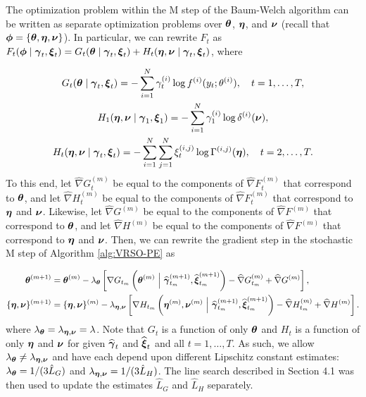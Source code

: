 The optimization problem within the M step of the Baum-Welch algorithm can be written as separate optimization problems over $\boldsymbol{\theta}$, $\boldsymbol{\eta}$, and $\boldsymbol{\nu}$ (recall that $\boldsymbol{\phi} = \{\boldsymbol{\theta},\boldsymbol{\eta},\boldsymbol{\nu}\}$). In particular, we can rewrite $F_t$ as $F_t(\boldsymbol{\phi} \mid \boldsymbol{\gamma}_t,  \boldsymbol{\xi}_t) = G_t(\boldsymbol{\theta} \mid  \boldsymbol{\gamma}_t,  \boldsymbol{\xi}_t) + H_t(\boldsymbol{\eta}, \boldsymbol{\nu} \mid  \boldsymbol{\gamma}_t,  \boldsymbol{\xi}_t)$, where

\begin{gather}
    G_t(\boldsymbol{\theta} \mid  \boldsymbol{\gamma}_t,  \boldsymbol{\xi}_t) = - \sum_{i=1}^N  \gamma^{(i)}_t \log f^{(i)}(y_t;\theta^{(i)}), \quad t = 1,\ldots,T, \\
    H_1(\boldsymbol{\eta}, \boldsymbol{\nu} \mid  \boldsymbol{\gamma}_1,  \boldsymbol{\xi}_1) = - \sum_{i=1}^N  \gamma^{(i)}_1 \log \delta^{(i)}(\boldsymbol{\nu}), \\
    H_t(\boldsymbol{\eta}, \boldsymbol{\nu} \mid \boldsymbol{\gamma}_t,  \boldsymbol{\xi}_t) =  - \sum_{i=1}^N \sum_{j=1}^N  \xi^{(i,j)}_t \log \Gamma^{(i,j)}(\boldsymbol{\eta}), \quad t = 2,\ldots,T.
\end{gather}
%
To this end, let $\widehat \nabla G^{(m)}_{t}$ be equal to the components of $\widehat \nabla F^{(m)}_{t}$ that correspond to $\boldsymbol{\theta}$, and let $\widehat \nabla H^{(m)}_{t}$ be equal to the components of $\widehat \nabla F^{(m)}_{t}$ that correspond to $\boldsymbol{\eta}$ and $\boldsymbol{\nu}$. Likewise, let $\widehat \nabla G^{(m)}$ be equal to the components of $\widehat \nabla F^{(m)}$ that correspond to $\boldsymbol{\theta}$, and let $\widehat \nabla H^{(m)}$ be equal to the components of $\widehat \nabla F^{(m)}$ that correspond to $\boldsymbol{\eta}$ and $\boldsymbol{\nu}$. Then, we can rewrite the gradient step in the stochastic M step of Algorithm \ref{alg:VRSO-PE} as

\begin{align}
    \boldsymbol{\theta}^{(m+1)} &= \boldsymbol{\theta}^{(m)} - \lambda_{\boldsymbol{\theta}} \left[\nabla G_{t_m}\left(\boldsymbol{\theta}^{(m)} ~ \Big | ~ \widehat {\boldsymbol{\gamma}}_{t_m}^{(m+1)}, \widehat {\boldsymbol{\xi}}_{t_m}^{(m+1)}\right) - \widehat \nabla G_{t_m}^{(m)} + \widehat \nabla G^{(m)} \right], \\
    \{\boldsymbol{\eta},\boldsymbol{\nu}\}^{(m+1)} &= \{\boldsymbol{\eta},\boldsymbol{\nu}\}^{(m)} - \lambda_{\boldsymbol{\eta},\boldsymbol{\nu}} \left[\nabla H_{t_m}\left(\boldsymbol{\eta}^{(m)}, \boldsymbol{\nu}^{(m)} ~ \Big | ~ \widehat {\boldsymbol{\gamma}}_{t_m}^{(m+1)}, \widehat {\boldsymbol{\xi}}_{t_m}^{(m+1)}\right) - \widehat \nabla H_{t_m}^{(m)} + \widehat \nabla H^{(m)} \right].
\end{align}
%
where $\lambda_{\boldsymbol{\theta}} = \lambda_{\boldsymbol{\eta},\boldsymbol{\nu}} = \lambda$. Note that $G_t$ is a function of only $\boldsymbol{\theta}$ and $H_t$ is a function of only $\boldsymbol{\eta}$ and $\boldsymbol{\nu}$ for given $\widehat {\boldsymbol{\gamma}}_{t}$ and $\widehat {\boldsymbol{\xi}}_{t}$ and all $t = 1,\ldots,T$. As such, we allow $\lambda_{\boldsymbol{\theta}} \neq \lambda_{\boldsymbol{\eta},\boldsymbol{\nu}}$ and have each depend upon different Lipschitz constant estimates: $\lambda_{\boldsymbol{\theta}} = 1/(3\hat L_G)$ and $\lambda_{\boldsymbol{\eta},\boldsymbol{\nu}} = 1/(3\hat L_H)$. The line search described in Section 4.1 was then used to update the estimates $\hat L_G$ and $\hat L_H$ separately.

